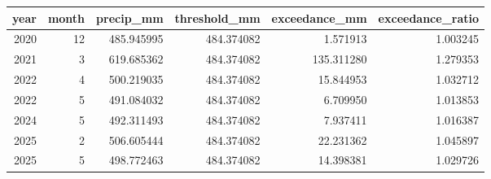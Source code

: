 \begin{tabular}{rrrrrr}
\toprule
year & month & precip\_mm & threshold\_mm & exceedance\_mm & exceedance\_ratio \\
\midrule
2020 & 12 & 485.945995 & 484.374082 & 1.571913 & 1.003245 \\
2021 & 3 & 619.685362 & 484.374082 & 135.311280 & 1.279353 \\
2022 & 4 & 500.219035 & 484.374082 & 15.844953 & 1.032712 \\
2022 & 5 & 491.084032 & 484.374082 & 6.709950 & 1.013853 \\
2024 & 5 & 492.311493 & 484.374082 & 7.937411 & 1.016387 \\
2025 & 2 & 506.605444 & 484.374082 & 22.231362 & 1.045897 \\
2025 & 5 & 498.772463 & 484.374082 & 14.398381 & 1.029726 \\
\bottomrule
\end{tabular}
